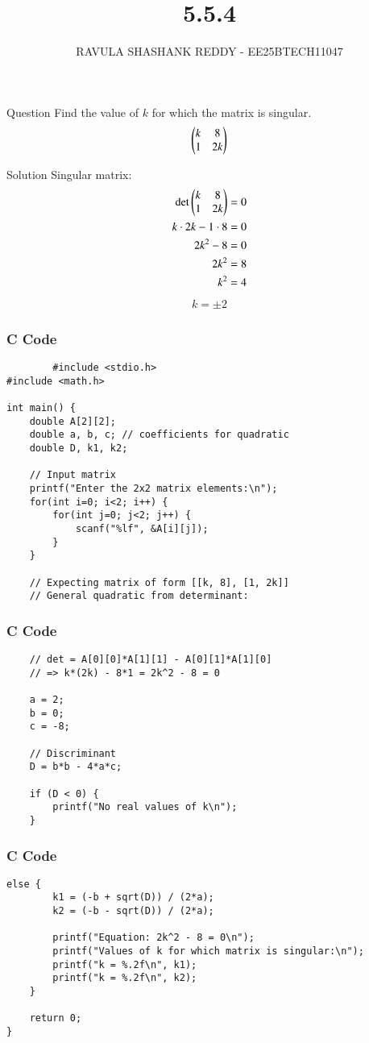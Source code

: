 \documentclass{beamer}
\title %
{5.5.4}
\author %
{RAVULA SHASHANK REDDY - EE25BTECH11047}
\begin{document}
	
	
	\frame{\titlepage}
	\begin{frame}{Question}
    Find the value of $k$ for which the matrix is singular.
\begin{align*}
\begin{pmatrix}k & 8 \\ 1 & 2k\end{pmatrix}
\end{align*}

\end{frame}
\begin{frame}{Solution}
    Singular matrix:
\begin{align}
\det\begin{pmatrix}k & 8 \\ 1 & 2k\end{pmatrix} &= 0 \\
k \cdot 2k - 1 \cdot 8 &= 0\\
2k^2 - 8 &= 0 \\
2k^2 &= 8 \\
k^2 &= 4 
\end{align}
\begin{align}
\boxed{
k = \pm 2}
\end{align}

\end{frame}
\begin{frame}[fragile]
    \frametitle{C Code}
    \begin{lstlisting}
        #include <stdio.h>
#include <math.h>

int main() {
    double A[2][2];
    double a, b, c; // coefficients for quadratic
    double D, k1, k2;

    // Input matrix
    printf("Enter the 2x2 matrix elements:\n");
    for(int i=0; i<2; i++) {
        for(int j=0; j<2; j++) {
            scanf("%lf", &A[i][j]);
        }
    }

    // Expecting matrix of form [[k, 8], [1, 2k]]
    // General quadratic from determinant:
    \end{lstlisting}
    \end{frame}
\begin{frame}[fragile]
    \frametitle{C Code}
    \begin{lstlisting}
    // det = A[0][0]*A[1][1] - A[0][1]*A[1][0]
    // => k*(2k) - 8*1 = 2k^2 - 8 = 0

    a = 2;
    b = 0;
    c = -8;

    // Discriminant
    D = b*b - 4*a*c;

    if (D < 0) {
        printf("No real values of k\n");
    }
     \end{lstlisting}
    \end{frame}
\begin{frame}[fragile]
    \frametitle{C Code}
    \begin{lstlisting}else {
        k1 = (-b + sqrt(D)) / (2*a);
        k2 = (-b - sqrt(D)) / (2*a);

        printf("Equation: 2k^2 - 8 = 0\n");
        printf("Values of k for which matrix is singular:\n");
        printf("k = %.2f\n", k1);
        printf("k = %.2f\n", k2);
    }

    return 0;
}

    \end{lstlisting}
\end{frame}
\end{document}
